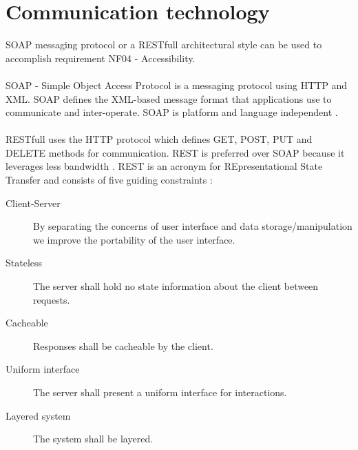 \section{Communication technology}
SOAP messaging protocol or a RESTfull architectural style can be used to accomplish requirement NF04 - Accessibility.\\\\ SOAP - Simple Object Access Protocol is a messaging protocol using HTTP and XML. SOAP defines the XML-based message format that applications use to communicate and inter-operate. SOAP is platform and language independent \cite{SOAP}. \\\\ RESTfull uses the HTTP protocol which defines GET, POST, PUT and DELETE methods for communication. REST is preferred over SOAP because it leverages less bandwidth \cite{restfull}. 
REST is an acronym for REpresentational State Transfer and consists of five guiding constraints \cite{rest}:
\begin{description}
\item [Client-Server] By separating the concerns of user interface and data storage/manipulation we improve the portability of the user interface.
\item [Stateless] The server shall hold no state information about the client between requests.
\item [Cacheable] Responses shall be cacheable by the client.
\item [Uniform interface] The server shall present a uniform interface for interactions.
\item [Layered system] The system shall be layered.
\end{description}



